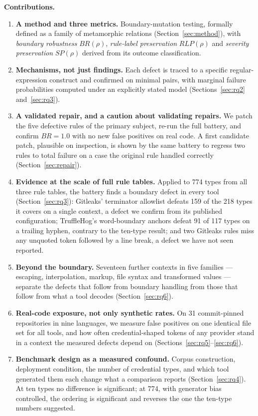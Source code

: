 \documentclass[pdflatex,sn-basic]{sn-jnl}
\begin{document}
\medskip\noindent\textbf{Contributions.}
\begin{enumerate}
\item \textbf{A method and three metrics.} Boundary-mutation testing, formally defined as a family of metamorphic relations (Section~\ref{sec:method}), with \emph{boundary robustness} $BR(\rho)$, \emph{rule-label preservation} $RLP(\rho)$ and \emph{severity preservation} $SP(\rho)$ derived from its outcome classification.
\item \textbf{Mechanisms, not just findings.} Each defect is traced to a specific regular-expression construct and confirmed on minimal pairs, with marginal failure probabilities computed under an explicitly stated model (Sections~\ref{sec:rq2} and~\ref{sec:rq3}).
\item \textbf{A validated repair, and a caution about validating repairs.} We patch the five defective rules of the primary subject, re-run the full battery, and confirm $BR=1.0$ with no new false positives on real code. A first candidate patch, plausible on inspection, is shown by the same battery to regress two rules to total failure on a case the original rule handled correctly (Section~\ref{sec:repair}).
\item \textbf{Evidence at the scale of full rule tables.} Applied to 774 types from all three rule tables, the battery finds a boundary defect in every tool (Section~\ref{sec:rq3}): Gitleaks' terminator allowlist defeats 159 of the 218 types it covers on a single context, a defect we confirm from its published configuration; TruffleHog's word-boundary anchors defeat 91 of 117 types on a trailing hyphen, contrary to the ten-type result; and two Gitleaks rules miss any unquoted token followed by a line break, a defect we have not seen reported.
\item \textbf{Beyond the boundary.} Seventeen further contexts in five families --- escaping, interpolation, markup, file syntax and transformed values --- separate the defects that follow from boundary handling from those that follow from what a tool decodes (Section~\ref{sec:rq6}).
\item \textbf{Real-code exposure, not only synthetic rates.} On 31 commit-pinned repositories in nine languages, we measure false positives on one identical file set for all tools, and how often credential-shaped tokens of any provider stand in a context the measured defects depend on (Sections~\ref{sec:rq5}--\ref{sec:rq6}).
\item \textbf{Benchmark design as a measured confound.} Corpus construction, deployment condition, the number of credential types, and which tool generated them each change what a comparison reports (Section~\ref{sec:rq4}). At ten types no difference is significant; at 774, with generator bias controlled, the ordering is significant and reverses the one the ten-type numbers suggested.
\end{enumerate}
\end{document}
